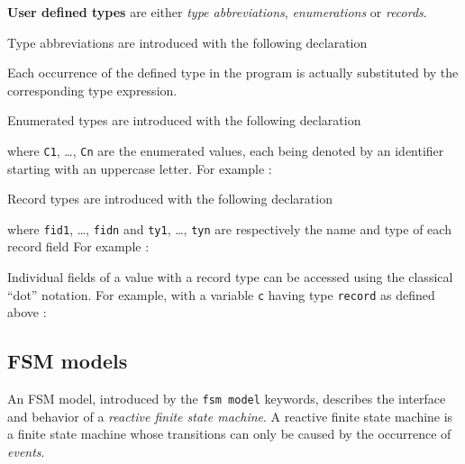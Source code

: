 \medskip
\textbf{User defined types} are either \emph{type abbreviations}, \emph{enumerations} or
\emph{records}.

\step Type abbreviations are introduced with the following declaration
\begin{center}
\end{center}
Each occurrence of the defined type in the program is actually substituted by the corresponding type
expression.

\medskip
\step Enumerated types  are introduced with the following declaration
\begin{center}
\end{center}
where \verb|C1|, \ldots, \verb|Cn| are the enumerated values, each being denoted by an identifier
starting with an uppercase letter. For example : 
\begin{center}
\end{center}

\medskip
\step Record types are introduced with the following declaration
\begin{center}
\end{center}
where \verb|fid1|, \ldots, \verb|fidn| and \verb|ty1|, \ldots, \verb|tyn| are respectively the name
and type of each record field For example : 
\begin{center}
\end{center}

Individual fields of a value with a record type can be accessed using the classical ``dot''
notation. For example, with a variable \verb|c| having type \verb|record| as defined above :
\begin{center}
\end{center}


\subsection{FSM models}
\label{sec:fsm-models}

An FSM model, introduced by the \verb|fsm model| keywords, describes the interface and behavior of a
\emph{reactive finite state machine}. A reactive finite state machine is a finite state machine
whose transitions can only be caused by the occurrence of \emph{events}.

